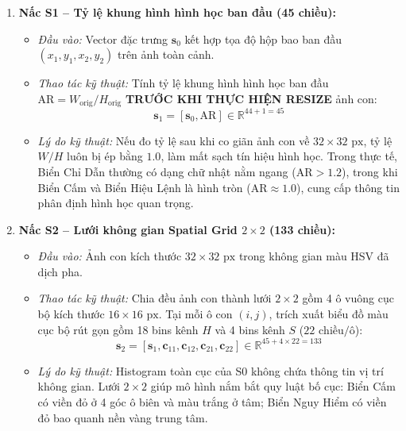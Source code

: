 \begin{enumerate}
    \item \textbf{Nấc S1 -- Tỷ lệ khung hình hình học ban đầu (45 chiều):}
    \begin{itemize}
        \item \textit{Đầu vào:} Vector đặc trưng $\mathbf{s}_0$ kết hợp tọa độ hộp bao ban đầu $(x_1, y_1, x_2, y_2)$ trên ảnh toàn cảnh.
        \item \textit{Thao tác kỹ thuật:} Tính tỷ lệ khung hình hình học ban đầu $\text{AR} = W_{\text{orig}} / H_{\text{orig}}$ \textbf{TRƯỚC KHI THỰC HIỆN RESIZE} ảnh con:
        \begin{equation}
            \mathbf{s}_1 = [\mathbf{s}_0, \text{AR}] \in \mathbb{R}^{44 + 1 = 45}
        \end{equation}
        \item \textit{Lý do kỹ thuật:} Nếu đo tỷ lệ sau khi co giãn ảnh con về $32 \times 32\text{ px}$, tỷ lệ $W/H$ luôn bị ép bằng $1.0$, làm mất sạch tín hiệu hình học. Trong thực tế, Biển Chỉ Dẫn thường có dạng chữ nhật nằm ngang ($\text{AR} > 1.2$), trong khi Biển Cấm và Biển Hiệu Lệnh là hình tròn ($\text{AR} \approx 1.0$), cung cấp thông tin phân định hình học quan trọng.
    \end{itemize}

    \item \textbf{Nấc S2 -- Lưới không gian Spatial Grid $2 \times 2$ (133 chiều):}
    \begin{itemize}
        \item \textit{Đầu vào:} Ảnh con kích thước $32 \times 32\text{ px}$ trong không gian màu HSV đã dịch pha.
        \item \textit{Thao tác kỹ thuật:} Chia đều ảnh con thành lưới $2 \times 2$ gồm 4 ô vuông cục bộ kích thước $16 \times 16\text{ px}$. Tại mỗi ô con $(i, j)$, trích xuất biểu đồ màu cục bộ rút gọn gồm 18 bins kênh $H$ và 4 bins kênh $S$ ($22\text{ chiều/ô}$):
        \begin{equation}
            \mathbf{s}_2 = [\mathbf{s}_1, \mathbf{c}_{11}, \mathbf{c}_{12}, \mathbf{c}_{21}, \mathbf{c}_{22}] \in \mathbb{R}^{45 + 4 \times 22 = 133}
        \end{equation}
        \item \textit{Lý do kỹ thuật:} Histogram toàn cục của S0 không chứa thông tin vị trí không gian. Lưới $2 \times 2$ giúp mô hình nắm bắt quy luật bố cục: Biển Cấm có viền đỏ ở 4 góc ô biên và màu trắng ở tâm; Biển Nguy Hiểm có viền đỏ bao quanh nền vàng trung tâm.
    \end{itemize}


\end{enumerate}

